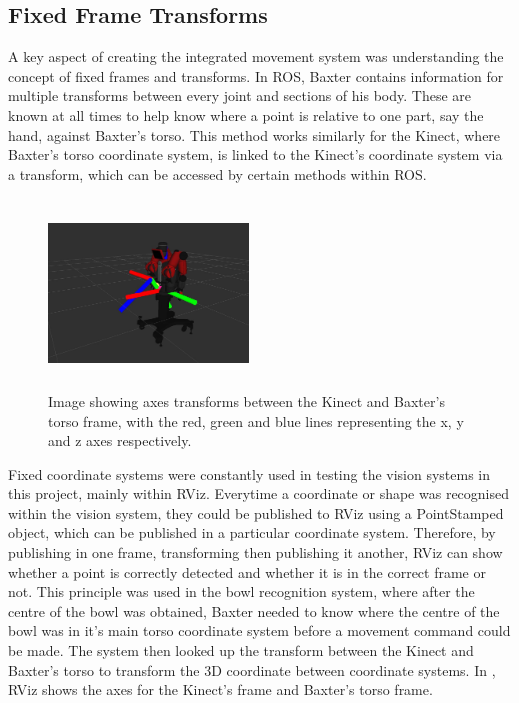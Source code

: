 \subsection{Fixed Frame Transforms}
\label{ssec:fft}
A key aspect of creating the integrated movement system was understanding the concept of fixed frames and transforms. In ROS, Baxter contains information for multiple transforms between every joint and sections of his body. These are known at all times to help know where a point is relative to one part, say the hand, against Baxter's torso. This method works similarly for the Kinect, where Baxter's torso coordinate system, is linked to the Kinect's coordinate system via a transform, which can be accessed by certain methods within ROS.
\begin{figure}[H]
        \centering 
        \includegraphics[width=0.475\textwidth, height=5cm]{fixedframe.jpg}
        \caption{Image showing axes transforms between the Kinect and Baxter's torso frame, with the red, green and blue lines representing the x, y and z axes respectively.}
        \label{fig:fixedframe}
\end{figure}
Fixed coordinate systems were constantly used in testing the vision systems in this project, mainly within RViz. Everytime a coordinate or shape was recognised within the vision system, they could be published to RViz using a PointStamped object, which can be published in a particular coordinate system. Therefore, by publishing in one frame, transforming then publishing it another, RViz can show whether a point is correctly detected and whether it is in the correct frame or not.
\newline\newline
This principle was used in the bowl recognition system, where after the centre of the bowl was obtained, Baxter needed to know where the centre of the bowl was in it's main torso coordinate system before a movement command could be made. The system then looked up the transform between the Kinect and Baxter's torso to transform the 3D coordinate between coordinate systems. In \textbf{}, RViz shows the axes for the Kinect's frame and Baxter's torso frame.
